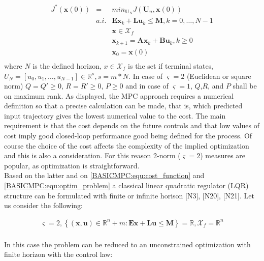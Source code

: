 		\begin{equation}
        \begin{array}{rcl}
				J^*(\textbf{x}(0))&=&min_{\textbf{U}_N}J(\textbf{U}_n,\textbf{x}(0))\\
					&a.i.&\textbf{Ex}_k+\textbf{Lu}_k\leq \textbf{M},k=0,\dots,N-1\\
					&&\textbf{x}\in \mathcal{X}_f\\
					&&\textbf{x}_{k+1}=\textbf{Ax}_k+\textbf{Bu}_k,k\geq0\\
					&&\textbf{x}_0=\textbf{x}(0)\\
        \end{array}
        \label{BASICMPC:equ:optim_problem}
    \end{equation}
		where $N$ is the defined horizon, $x\in \mathcal{X}_f$ is the set if terminal states, $U_N=[u_0,u_1,\dots,u_{N-1}]\in\mathbb{R}^s,s=m*N$. In case of $\varsigma=2$ (Euclidean or square norm) $Q=Q'\geq0$, $R=R'\geq0$, $P\geq0$ and in case of $\varsigma=1$, $Q$,$R$, and $P$ shall be on maximum rank. As displayed, the MPC approach requires a numerical definition so that a precise calculation can be made, that is, which predicted input trajectory gives the lowest numerical value to the cost. The main requirement is that the cost depends on the future controls and that low values of cost imply good closed-loop performance good being defined for the process. Of course the choice of the cost affects the complexity of the implied optimization and this is also a consideration. For this reason 2-norm ($\varsigma=2$) measures are popular, as optimization is straightforward.\\
		Based on the latter and on \ref{BASICMPC:equ:cost_function} and \ref{BASICMPC:equ:optim_problem} a classical linear quadratic regulator (LQR) structure can be formulated with finite or infinite horison [N3], [N20], [N21].
		Let us consider the following:
		
		\begin{equation}
        \begin{array}{c}
         \varsigma=2, \left\{(\textbf{x},\textbf{u})\in\mathbb{R}^n+m:\textbf{Ex}+\textbf{Lu}\leq \textbf{M}\right\}=\mathbb{R},\mathcal{X}_f=\mathbb{R}^n\\
        \end{array}
        \label{BASICMPC:equ:quadratic_case}
    \end{equation}
		
		In this case the problem can be reduced to an unconstrained optimization with finite horizon with the control law: 
		
